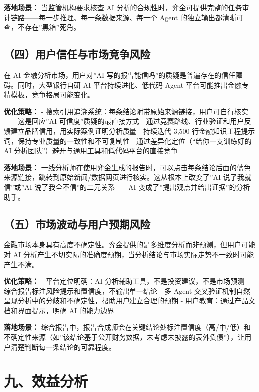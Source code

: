 \documentclass[
]{ctexart}
\begin{document}
\textbf{落地场景：} 当监管机构要求核查 AI
分析的合规性时，弈金可提供完整的任务审计链路------每一步推理、每一条数据来源、每一个
Agent 的独立输出都清晰可查，不存在''黑箱''死角。

\subsection{（四）用户信任与市场竞争风险}\label{ux56dbux7528ux6237ux4fe1ux4efbux4e0eux5e02ux573aux7adeux4e89ux98ceux9669}

在 AI 金融分析市场，用户对''AI
写的报告能信吗''的质疑是普遍存在的信任障碍。同时，大型银行自研 AI
平台持续进化、低代码 Agent 平台可能推出金融专精模板，竞争格局可能变化。

\textbf{优化策略：} -
搜索引用追溯系统：每条结论附带原始来源链接，用户可自行核实------这是回应''AI
可信度''质疑的最直接方式 -
通过竞赛路线、行业验证和用户反馈建立品牌信用，用实际案例证明分析质量 -
持续迭代 3,500 行金融知识工程提示词，保持专业质量的一致性和不可复制性 -
通过差异化定位（``给你一支训练好的 AI
分析团队''）避开与通用工具和低代码平台的直接竞争

\textbf{落地场景：}
一线分析师在使用弈金生成的报告时，可以点击每条结论后面的蓝色来源链接，跳转到原始新闻/数据网页进行核实。这从根本上改变了''AI
说了我就信''或''AI 说了我全不信''的二元关系------AI
变成了''提出观点并给出证据''的分析助手。

\subsection{（五）市场波动与用户预期风险}\label{ux4e94ux5e02ux573aux6ce2ux52a8ux4e0eux7528ux6237ux9884ux671fux98ceux9669}

金融市场本身具有高度不确定性。弈金提供的是多维度分析而非预测，但用户可能对
AI
分析产生不切实际的准确度预期，当分析结论与市场实际走势不一致时可能产生不满。

\textbf{优化策略：} - 平台定位明确：AI
分析辅助工具，不是投资建议，不是市场预测 -
综合报告标注风险提示和置信度，不输出单一结论 - 多 Agent
交叉验证机制自然呈现分析中的分歧和不确定性，帮助用户建立合理的预期 -
用户教育：通过产品文档和界面提示，明确 AI 的能力边界

\textbf{落地场景：}
综合报告中，报告合成师会在关键结论处标注置信度（高/中/低）和不确定性来源（如''该结论基于公开财务数据，未考虑未披露的表外负债''），让用户清楚判断每一条结论的可靠程度。

\section{九、效益分析}\label{ux4e5dux6548ux76caux5206ux6790}
\end{document}
